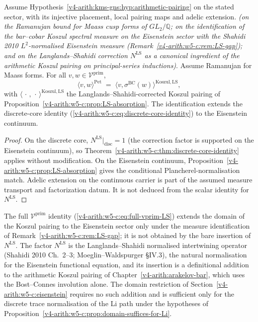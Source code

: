 \begin{theorem}
\label{v4-arith:w5-c:thm:full-vprim-LS}
Assume Hypothesis~\ref{v4-arith:kms-gns:hyp:arithmetic-pairing}
on the stated sector, with its injective placement, local pairing maps
and adelic extension.
\emph{(on the Ramanujan bound for Maass cusp
forms of \(GL_{2}/\mathbb{Q}\); on the identification of the bar--cobar
Koszul spectral measure on the Eisenstein sector with the Shahidi 2010
\(L^{2}\)-normalised Eisenstein measure
(Remark~\ref{v4-arith:w5-c:rem:LS-gap}); and on the Langlands--Shahidi
correction \(N^{\mathrm{LS}}\) as a canonical ingredient of the arithmetic
Koszul pairing on principal-series inductions)}. Assume Ramanujan for
Maass forms. For all \(v,w\in\mathcal{V}^{\mathrm{prim}}\),
\begin{equation}
\label{v4-arith:w5-c:eq:full-vprim-LS}
\langle v,w\rangle^{\mathrm{Pet}}
\;=\;\langle v,\sigma^{\mathrm{BC}}(w)\rangle^{\mathrm{Koszul},\mathrm{LS}},
\end{equation}
with \(\langle\,\cdot\,,\,\cdot\,\rangle^{\mathrm{Koszul},\mathrm{LS}}\)
the Langlands--Shahidi-corrected Koszul pairing of
Proposition~\ref{v4-arith:w5-c:prop:LS-absorption}. The identification extends
the discrete-core identity
(\ref{v4-arith:w5-c:eq:discrete-core-identity}) to the Eisenstein
continuum.
\end{theorem}

\begin{proof}
On the discrete core, \(N^{\mathrm{LS}}|_{\mathrm{disc}}=1\)
(the correction factor is supported on the Eisenstein continuum),
so Theorem~\ref{v4-arith:w5-c:thm:discrete-core-identity} applies without
modification. On the Eisenstein continuum,
Proposition~\ref{v4-arith:w5-c:prop:LS-absorption} gives the conditional
Plancherel-normalisation match.
Adelic extension on the continuous carrier is part of the assumed
measure transport and factorization datum. It is not deduced from
the scalar identity for \(N^{\mathrm{LS}}\).
\end{proof}

\begin{remark}
\label{v4-arith:w5-c:rem:LS-cost}
The full \(\mathcal{V}^{\mathrm{prim}}\) identity
(\ref{v4-arith:w5-c:eq:full-vprim-LS}) extends the domain of the
Koszul pairing to the Eisenstein sector only under the measure
identification of Remark~\ref{v4-arith:w5-c:rem:LS-gap}; it is not obtained
by the bare insertion of
\(N^{\mathrm{LS}}\). The factor \(N^{\mathrm{LS}}\) is the
Langlands--Shahidi normalised intertwining operator
(Shahidi 2010 Ch.~2--3; Moeglin--Waldspurger \S IV.3), the natural
normalisation for the Eisenstein functional equation, and its insertion
is a definitional addition to the arithmetic Koszul pairing of
Chapter~\ref{v4-arith:arakelov-bar}, which uses the Bost--Connes
involution alone. The domain restriction of
Section~\ref{v4-arith:w5-c:eisenstein} requires no such addition and
is sufficient only for the discrete trace normalisation of the Li path
under the hypotheses of
Proposition~\ref{v4-arith:w5-c:prop:domain-suffices-for-Li}.
\end{remark}

